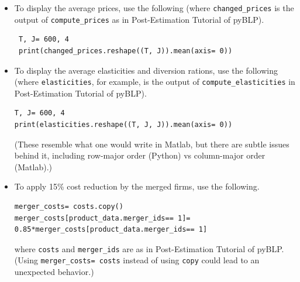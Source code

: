 \documentclass{article}
\begin{document}
\begin{tcolorbox}
\begin{itemize}
  \item To display the average prices, use the following (where \texttt{changed\_prices} is the output of \texttt{compute\_prices} as in Post-Estimation Tutorial of pyBLP).
\begin{verbatim}
 T, J= 600, 4
 print(changed_prices.reshape((T, J)).mean(axis= 0))
\end{verbatim}

  \item To display the average elasticities and diversion rations, use the following (where \texttt{elasticities}, for example, is the output of \texttt{compute\_elasticities} in Post-Estimation Tutorial of pyBLP).
\begin{verbatim}
T, J= 600, 4
print(elasticities.reshape((T, J, J)).mean(axis= 0))
\end{verbatim}
(These resemble what one would write in Matlab, but there are subtle issues behind it, including row-major order (Python) vs column-major order (Matlab).)

  \item To apply 15\% cost reduction by the merged firms, use the following.
\begin{verbatim}
merger_costs= costs.copy()
merger_costs[product_data.merger_ids== 1]= 0.85*merger_costs[product_data.merger_ids== 1]
\end{verbatim}
\noindent where \texttt{costs} and \texttt{merger\_ids} are as in Post-Estimation Tutorial of pyBLP. (Using \texttt{merger\_costs= costs} instead of using \texttt{copy} could lead to an unexpected behavior.)
\end{itemize}
\end{tcolorbox}
\end{document}
